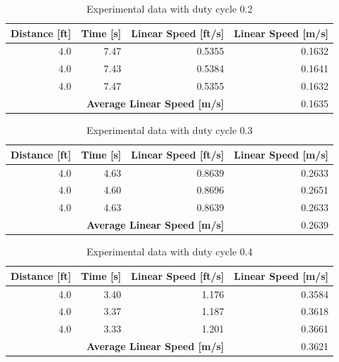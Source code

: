 \documentclass[fontsize=11pt, %
                             paper=letter, %
                             openany, %
                             captions=tableheading,
                             index=totoc,
                             hyperref]{labbook}
\begin{document}
\begin{addmargin}[0cm]{0cm}
\begin{table}[h!]
    \centering
    \begin{tabular}{r|r|r|r}
        \toprule
        \textbf{Distance [ft]} & \textbf{Time [s]} & \textbf{Linear Speed [ft/s]} & \textbf{Linear Speed [m/s]}\\
        \toprule
        4.0 & 7.47 & 0.5355 & 0.1632\\
        4.0 & 7.43 & 0.5384 & 0.1641\\
        4.0 & 7.47 & 0.5355 & 0.1632\\
        \bottomrule
        \multicolumn{3}{r|}{\textbf{Average Linear Speed [m/s]}} & 0.1635\\
        \bottomrule
    \end{tabular}
    \caption{Experimental data with duty cycle 0.2}
    \label{tab:duty0.2}
\end{table}

\begin{table}[h!]
    \centering
    \begin{tabular}{r|r|r|r}
        \toprule
        \textbf{Distance [ft]} & \textbf{Time [s]} & \textbf{Linear Speed [ft/s]} & \textbf{Linear Speed [m/s]}\\
        \toprule
        4.0 & 4.63 & 0.8639 & 0.2633\\
        4.0 & 4.60 & 0.8696 & 0.2651\\
        4.0 & 4.63 & 0.8639 & 0.2633\\
        \bottomrule
        \multicolumn{3}{r|}{\textbf{Average Linear Speed [m/s]}} & 0.2639\\
        \bottomrule
    \end{tabular}
    \caption{Experimental data with duty cycle 0.3}
    \label{tab:duty0.3}
\end{table}

\begin{table}[h!]
    \centering
    \begin{tabular}{r|r|r|r}
        \toprule
        \textbf{Distance [ft]} & \textbf{Time [s]} & \textbf{Linear Speed [ft/s]} & \textbf{Linear Speed [m/s]}\\
        \toprule
        4.0 & 3.40 & 1.176 & 0.3584\\
        4.0 & 3.37 & 1.187 & 0.3618\\
        4.0 & 3.33 & 1.201 & 0.3661\\
        \bottomrule
        \multicolumn{3}{r|}{\textbf{Average Linear Speed [m/s]}} & 0.3621\\
        \bottomrule
    \end{tabular}
    \caption{Experimental data with duty cycle 0.4}
    \label{tab:duty0.4}
\end{table}


\end{addmargin}
\end{document}
